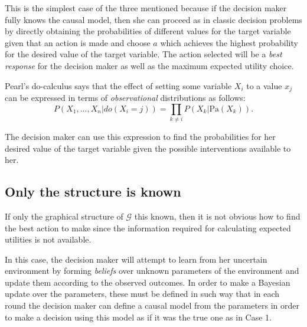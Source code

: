\documentclass{article}
\begin{document}
This is the simplest case of the three mentioned because if the decision maker fully knows the causal model, then she can proceed as in classic decision problems by directly obtaining the probabilities of different values for the target variable given that an action is made and choose $a$ which achieves the highest probability for the desired value of the target variable. The action selected will be a \textit{best response} for the decision maker as well as the maximum expected utility choice.

Pearl's do-calculus \cite{pearl2009causality} says that the effect of setting some variable $X_i$ to a value $x_j$ can be expressed in terms of \textit{observational} distributions as follows:
\[ P(X_1,...,X_n | do(X_i = j )) = \prod_{k \neq i} P(X_k | \textrm{Pa}(X_k)). \]

The decision maker can use this expression to find the probabilities for her desired value of the target variable given the possible interventions available to her.

\subsection{Only the structure is known}
If only the graphical structure of $\mathcal{G}$ this known, then it is not obvious how to find the best action to make since the information required for calculating expected utilities is not available.

In this case, the decision maker will attempt to learn from her uncertain environment by forming \textit{beliefs} over unknown parameters of the environment and update them according to the observed outcomes. In order to make a Bayesian update over the parameters, these must be defined in such way that in each round the decision maker can define a causal model from the parameters in order to make a decision using this model as if it was the true one as in Case 1.
\end{document}
